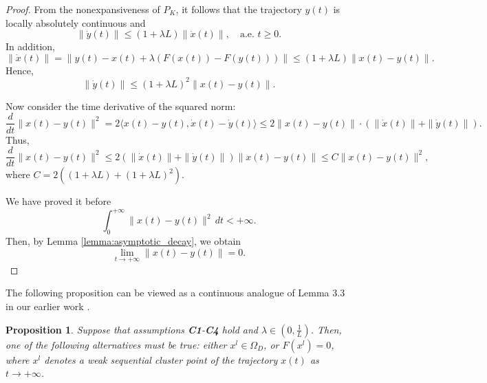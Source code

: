 \documentclass[hidelinks,11 pt]{article}
\numberwithin{equation}{section}
\newtheorem{proposition}[theorem]{Proposition}
\theoremstyle{definition}  %
\numberwithin{equation}{section}
\numberwithin{theorem}{section}
\begin{document}
\begin{proof}
From the nonexpansiveness of \(P_K\), it follows that the trajectory \(y(t)\) is locally absolutely continuous and
\[
\|\dot{y}(t)\| \leq (1 + \lambda L)\|\dot{x}(t)\|, \quad \text{a.e. } t \geq 0.
\]
In addition,
\[
\|\dot{x}(t)\| = \|y(t) - x(t) + \lambda(F(x(t)) - F(y(t)))\|
\leq (1 + \lambda L)\|x(t) - y(t)\|.
\]
Hence,
\[
\|\dot{y}(t)\| \leq (1 + \lambda L)^2 \|x(t) - y(t)\|.
\]

Now consider the time derivative of the squared norm:
\[
\frac{d}{dt} \|x(t) - y(t)\|^2 = 2 \langle x(t) - y(t), \dot{x}(t) - \dot{y}(t) \rangle
\leq 2\|x(t) - y(t)\| \cdot \left(\|\dot{x}(t)\| + \|\dot{y}(t)\|\right).
\]
Thus,
\[
\frac{d}{dt} \|x(t) - y(t)\|^2 \leq 2\left(\|\dot{x}(t)\| + \|\dot{y}(t)\|\right)\|x(t) - y(t)\|
\leq C \|x(t) - y(t)\|^2,
\]
where \(C = 2\left((1 + \lambda L) + (1 + \lambda L)^2\right)\).

We have proved it before
\[
\int_0^{+\infty} \|x(t) - y(t)\|^2 \, dt < +\infty.
\]
Then, by Lemma \ref{lemma:asymptotic_decay}, we obtain
\[
\lim_{t \to +\infty} \|x(t) - y(t)\| = 0.
\]
\end{proof}
The following proposition can be viewed as a continuous analogue of Lemma 3.3 in our earlier work \cite{a25}.
\begin{proposition}\label{p3.5}
Suppose that assumptions \textbf{C1}-\textbf{C4} hold and $\lambda\in(0,\frac{1}{L})$. Then, one of the following alternatives must be true: either \( x^l \in \Omega_{D} \), or \( F(x^l) = 0 \), where \( x^l \) denotes a weak sequential cluster point of the trajectory \( x(t) \) as \( t \to +\infty \).
\end{proposition}
\end{document}
